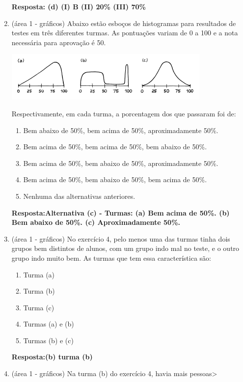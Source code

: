 \documentclass[12pt]{article}\documentclass[brazilian,12pt,a4paper,final]{article}
\begin{document}
\begin{enumerate}
\begin{enumerate}[label=(\alph*)]
\end{enumerate}
\textbf{Resposta: (d) (I) B (II) 20\% (III) 70\%}

\item (área 1 - gráficos) Abaixo estão esboços de histogramas para resultados de testes em três diferentes turmas. As pontuações variam de 0 a 100 e a nota necessária para aprovação é 50.

 \includegraphics{Figuras/3A4.png}
 
Respectivamente, em cada turma, a porcentagem dos que passaram foi de:

\begin{enumerate}[label=(\alph*)]
\item Bem abaixo de 50\%, bem acima de 50\%, aproximadamente 50\%.
\item Bem acima de 50\%, bem acima de 50\%, bem abaixo de 50\%. 
\item Bem acima de 50\%, bem abaixo de 50\%, aproximadamente 50\%. 
\item Bem acima de 50\%, bem abaixo de 50\%, bem acima de 50\%. 
\item Nenhuma das alternativas anteriores.
\end{enumerate}

\textbf{Resposta:Alternativa (c) - Turmas: (a) Bem acima de 50\%. (b) Bem abaixo de 50\%. (c) Aproximadamente 50\%.}

\item (área 1 - gráficos) No exercício 4, pelo menos uma das turmas tinha dois grupos bem distintos de alunos, com um grupo
indo mal no teste, e o outro grupo indo muito bem. As turmas que tem essa característica são:

\begin{enumerate}[label=(\alph*)]
\item Turma (a)
\item Turma (b)
\item Turma (c)
\item Turmas (a) e (b)
\item Turmas (b) e (c)
\end{enumerate}

\textbf{Resposta:(b) turma (b)}

\item (área 1 - gráficos)
Na turma (b) do exercício 4, havia mais pessoas>


\end{enumerate}
\end{document}
